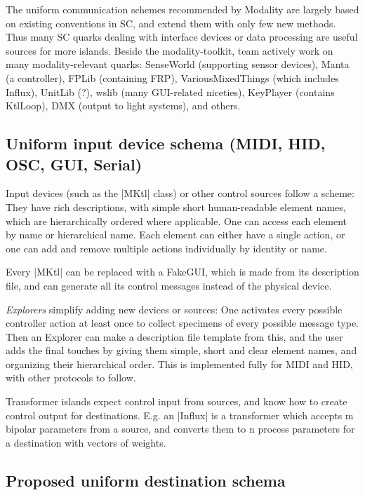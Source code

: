 \documentclass{article}
\begin{document}
The uniform communication schemes recommended by Modality are largely based on existing conventions in SC, and extend them with only few new methods. Thus many SC quarks dealing with interface devices or data processing are useful sources for more islands. 
Beside the modality-toolkit\cite{githubmodality}, team actively work on many modality-relevant quarks: SenseWorld (supporting sensor devices), Manta (a controller), FPLib (containing FRP), VariousMixedThings (which includes Influx), UnitLib (?), wslib (many GUI-related niceties), KeyPlayer (contains KtlLoop), DMX (output to light systems), and others.

\subsection{ Uniform input device schema (MIDI, HID, OSC, GUI, Serial) }

Input devices (such as the |MKtl| class) or other control sources follow a scheme: 
They have rich descriptions, with simple short human-readable element names, which are hierarchically ordered where applicable. 
One can access each element by name or hierarchical name.
Each element can either have a single action, or one can add and remove multiple actions individually by identity or name.

Every |MKtl| can be replaced with a FakeGUI, which is made from its description file, and can generate all its control messages instead of the physical device.

\emph{Explorers} simplify adding new devices or sources: 
One activates every possible controller action at least once to collect specimens of every possible message type. 
Then an Explorer can make a description file template from this, and the user adds the final touches by giving them simple, short and clear element names, and organizing their hierarchical order. 
This is implemented fully for MIDI and HID, with other protocols to follow.

Transformer islands expect control input from sources, and know how to create control output for destinations. E.g. an |Influx| is a transformer which accepts m bipolar parameters from a source, and converts them to n process parameters for a destination with vectors of weights. 

\subsection{Proposed uniform destination schema}
\end{document}
